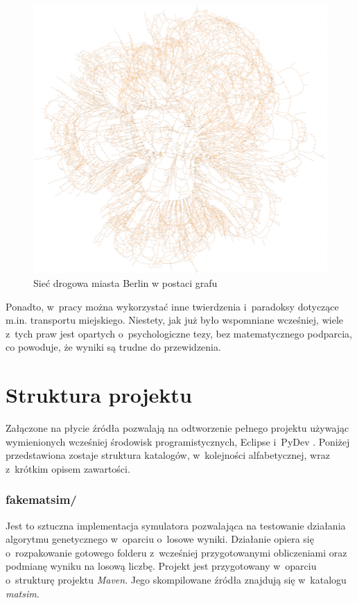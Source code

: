 \documentclass[twoside,12pt]{report}
\begin{document}
\begin{figure}[htbp]
\centering
\includegraphics[width=\textwidth]{img/berlin2}
\caption{Sieć drogowa miasta Berlin w postaci grafu}
\label{berlin}
\end{figure}

Ponadto, w~pracy można wykorzystać inne twierdzenia i~paradoksy dotyczące m.in. transportu miejskiego. Niestety, jak już było wspomniane wcześniej, wiele z~tych praw jest opartych o~psychologiczne tezy, bez matematycznego podparcia, co powoduje, że wyniki są trudne do przewidzenia.

\section{Struktura projektu}

Załączone na płycie źródła pozwalają na odtworzenie pełnego projektu używając wymienionych wcześniej środowisk programistycznych, Eclipse \cite{eclipse} i~PyDev \cite{pydev}. Poniżej przedstawiona zostaje struktura katalogów, w~kolejności alfabetycznej, wraz z~krótkim opisem zawartości.

\subsubsection{fakematsim/}
Jest to sztuczna implementacja symulatora pozwalająca na testowanie działania algorytmu genetycznego w~oparciu o~losowe wyniki. Działanie opiera się o~rozpakowanie gotowego folderu z~wcześniej przygotowanymi obliczeniami oraz podmianę wyniku na losową liczbę. Projekt jest przygotowany w~oparciu o~strukturę projektu \textit{Maven}. Jego skompilowane źródła znajdują się  w~katalogu \textit{matsim}.
\end{document}
